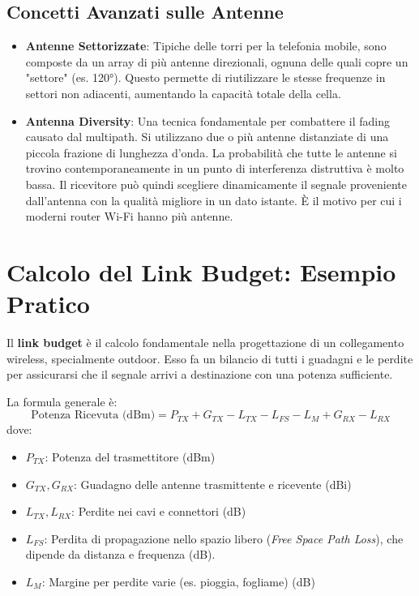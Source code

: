 \subsection{Concetti Avanzati sulle Antenne}
\begin{itemize}
    \item \textbf{Antenne Settorizzate}: Tipiche delle torri per la telefonia mobile, sono composte da un array di più antenne direzionali, ognuna delle quali copre un "settore" (es. 120°). Questo permette di riutilizzare le stesse frequenze in settori non adiacenti, aumentando la capacità totale della cella.
    \item \textbf{Antenna Diversity}: Una tecnica fondamentale per combattere il fading causato dal multipath. Si utilizzano due o più antenne distanziate di una piccola frazione di lunghezza d'onda. La probabilità che tutte le antenne si trovino contemporaneamente in un punto di interferenza distruttiva è molto bassa. Il ricevitore può quindi scegliere dinamicamente il segnale proveniente dall'antenna con la qualità migliore in un dato istante. È il motivo per cui i moderni router Wi-Fi hanno più antenne.
\end{itemize}

\section{Calcolo del Link Budget: Esempio Pratico}
Il \textbf{link budget} è il calcolo fondamentale nella progettazione di un collegamento wireless, specialmente outdoor. Esso fa un bilancio di tutti i guadagni e le perdite per assicurarsi che il segnale arrivi a destinazione con una potenza sufficiente.


La formula generale è:
$$ \text{Potenza Ricevuta (dBm)} = P_{TX} + G_{TX} - L_{TX} - L_{FS} - L_{M} + G_{RX} - L_{RX} $$
dove:
\begin{itemize}
    \item $P_{TX}$: Potenza del trasmettitore (dBm)
    \item $G_{TX}, G_{RX}$: Guadagno delle antenne trasmittente e ricevente (dBi)
    \item $L_{TX}, L_{RX}$: Perdite nei cavi e connettori (dB)
    \item $L_{FS}$: Perdita di propagazione nello spazio libero (\textit{Free Space Path Loss}), che dipende da distanza e frequenza (dB).
    \item $L_{M}$: Margine per perdite varie (es. pioggia, fogliame) (dB)
\end{itemize}

